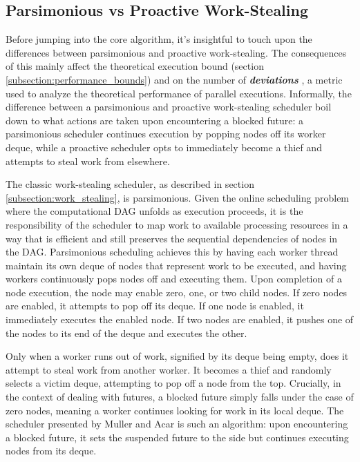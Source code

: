 \documentclass[bsc,frontabs,singlespacing,parskip,deptreport,normalheadings]{infthesis}
\begin{document}
\subsection{Parsimonious vs Proactive Work-Stealing}
\label{subsection:parsimonious_vs_proactive_work-stealing}

Before jumping into the core algorithm, it's insightful to touch upon the
differences between parsimonious and proactive work-stealing. The consequences
of this mainly affect the theoretical execution bound (section
\ref{subsection:performance_bounds}) and on the number of
\textit{\textbf{deviations}} \cite{spoonhower_beyond_2009}, a metric used to
analyze the theoretical performance of parallel executions. Informally, the
difference between a parsimonious and proactive work-stealing scheduler boil
down to what actions are taken upon encountering a blocked future: a
parsimonious scheduler continues execution by popping nodes off its worker
deque, while a proactive scheduler opts to immediately become a thief and
attempts to steal work from elsewhere. 

The classic work-stealing scheduler, as described in section
\ref{subsection:work_stealing}, is parsimonious. Given the online scheduling
problem where the computational DAG unfolds as execution proceeds, it is the
responsibility of the scheduler to map work to available processing resources in
a way that is efficient and still preserves the sequential dependencies of nodes
in the DAG. Parsimonious scheduling achieves this by having each worker thread
maintain its own deque of nodes that represent work to be executed, and having
workers continuously pops nodes off and executing them. Upon completion of a
node execution, the node may enable zero, one, or two child nodes. If zero nodes
are enabled, it attempts to pop off its deque. If one node is enabled, it
immediately executes the enabled node. If two nodes are enabled, it pushes one
of the nodes to its end of the deque and executes the other.

Only when a worker runs out of work, signified by its deque being empty, does it
attempt to steal work from another worker. It becomes a thief and randomly
selects a victim deque, attempting to pop off a node from the top. Crucially, in
the context of dealing with futures, a blocked future simply falls under the
case of zero nodes, meaning a worker continues looking for work in its local
deque. The scheduler presented by Muller and Acar
\cite{muller_latency-hiding_2016} is such an algorithm: upon encountering a
blocked future, it sets the suspended future to the side but continues executing
nodes from its deque.
\end{document}
